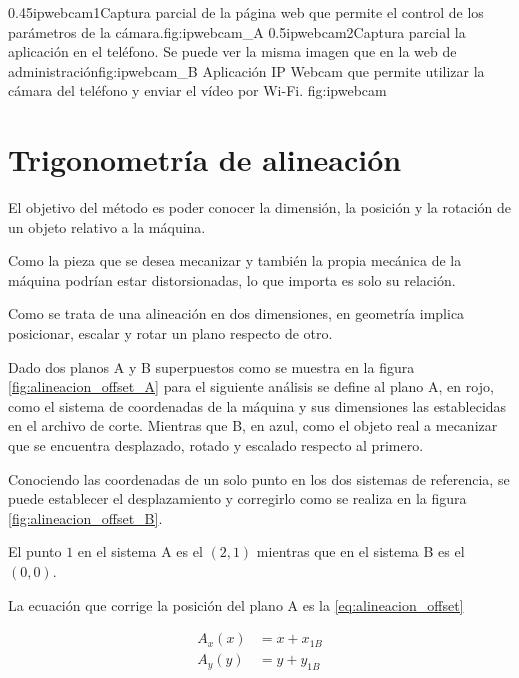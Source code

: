 \subfigab
         {0.45}{ipwebcam1}{Captura parcial de la página web que permite el control de los parámetros de la cámara.}{fig:ipwebcam_A}
         {0.5}{ipwebcam2}{Captura parcial la aplicación en el teléfono. Se puede ver la misma imagen que en la web de administración}{fig:ipwebcam_B}
         {Aplicación IP Webcam que permite utilizar la cámara del teléfono y enviar el vídeo por Wi-Fi.}
         {fig:ipwebcam}


\section{Trigonometría de alineación}
\label{section:trigonometria}

   El objetivo del método es poder conocer la dimensión, la posición y la rotación de un objeto relativo a la máquina. \par

Como la pieza que se desea mecanizar y también la propia mecánica de la máquina podrían estar distorsionadas, lo que importa es solo su relación. \par

   Como se trata de una alineación en dos dimensiones, en geometría implica posicionar, escalar y rotar un plano respecto de otro.\par

   Dado dos planos A y B superpuestos como se muestra en la figura \ref{fig:alineacion_offset_A} para el siguiente análisis se define al plano A, en rojo, como el sistema de coordenadas de la máquina y sus dimensiones las establecidas en el archivo de corte.
   Mientras que B, en azul, como el objeto real a mecanizar que se encuentra desplazado, rotado y escalado respecto al primero.\par
   Conociendo las coordenadas de un solo punto en los dos sistemas de referencia, se puede establecer el desplazamiento y corregirlo como se realiza en la figura \ref{fig:alineacion_offset_B}.\par
   El punto $1$ en el sistema A es el $(2,1)$ mientras que en el sistema B es el $(0,0)$.\par
   La ecuación que corrige la posición del plano A es la \ref{eq:alineacion_offset}

   \begin{equation}
      \begin{aligned}
         A_x(x) &= x+x_{1B} \\
         A_y(y) &= y+y_{1B}
      \end{aligned}
      \label{eq:alineacion_offset}
   \end{equation}

